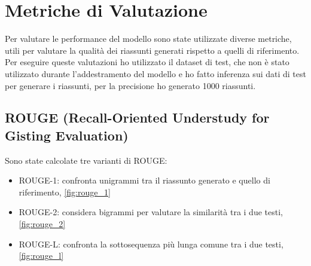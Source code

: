 \documentclass[a4paper, 12pt]{article}
\begin{document}
\section{Metriche di Valutazione}
Per valutare le performance del modello sono state utilizzate diverse metriche, utili per valutare la qualità dei riassunti generati rispetto a quelli di riferimento.\\
Per eseguire queste valutazioni ho utilizzato il dataset di test, che non è stato utilizzato durante l'addestramento del modello e ho fatto inferenza sui dati di test per generare i riassunti, per la precisione ho generato 1000 riassunti.\\

\subsection{ROUGE (Recall-Oriented Understudy for Gisting Evaluation)}
Sono state calcolate tre varianti di ROUGE:
\begin{itemize}
    \item ROUGE-1: confronta unigrammi tra il riassunto generato e quello di riferimento, \ref{fig:rouge_1}
    \item ROUGE-2: considera bigrammi per valutare la similarità tra i due testi, \ref{fig:rouge_2}
    \item ROUGE-L: confronta la sottosequenza più lunga comune tra i due testi, \ref{fig:rouge_l}
\end{itemize}
\end{document}
